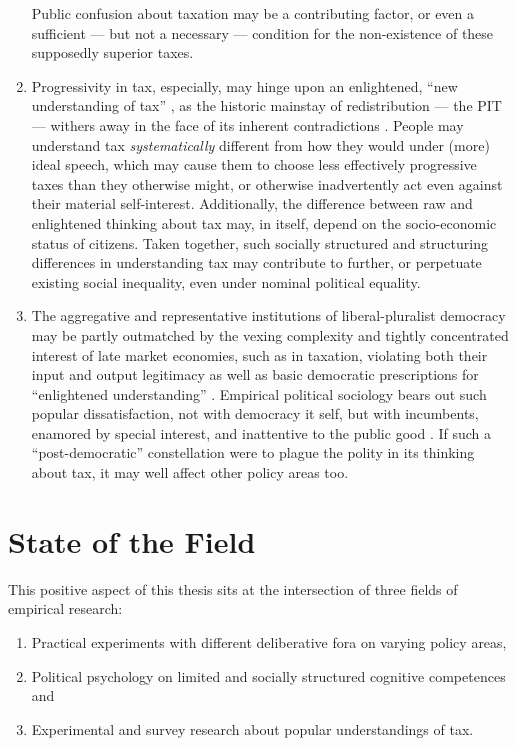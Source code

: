 \begin{enumerate}
		Public confusion about taxation may be a contributing factor, or even a sufficient --- but not a necessary --- condition for the non-existence of these supposedly superior taxes. 
	\item
		Progressivity in tax, especially, may hinge upon an enlightened, ``new understanding of tax'' \citep{McCaffery2005}, as the historic mainstay of redistribution --- the \gls{PIT} --- withers away in the face of its inherent contradictions \citep{McCafferyHines2010}.
		People may understand tax \emph{systematically} different from how they would under (more) ideal speech, which may cause them to choose less effectively progressive taxes than they otherwise might, or otherwise inadvertently act even against their material self-interest.
		Additionally, the difference between raw and enlightened thinking about tax may, in itself, depend on the socio-economic status of citizens.
		Taken together, such socially structured and structuring differences in understanding tax may contribute to further, or perpetuate existing social inequality, even under nominal political equality.
	\item
		The aggregative and representative institutions of liberal-pluralist democracy may be partly outmatched by the vexing complexity \citep{Merton-1968-aa} and tightly concentrated interest \citep{Olson-1971-aa} of late market economies, such as in taxation, violating both their input and output legitimacy \citep{Scharpf1997} as well as basic democratic prescriptions for ``enlightened understanding'' \citep{Dahl-1989-aa}.
		Empirical political sociology bears out such popular dissatisfaction, not with democracy it self, but with incumbents, enamored by special interest, and inattentive to the public good \citep{NyeJr.1997,Norris2011,PutnamPharr-2000-aa}.
		If such a ``post-democratic'' constellation \citep{Crouch2004} were to plague the polity in its thinking about tax, it may well affect other policy areas too.
\end{enumerate}

\section{State of the Field}
This positive aspect of this thesis sits at the intersection of three fields of empirical research: 
\begin{enumerate}
	\item Practical experiments with different deliberative fora on varying policy areas,
	\item Political psychology on limited and socially structured cognitive competences and
	\item Experimental and survey research about popular understandings of tax.
\end{enumerate}

